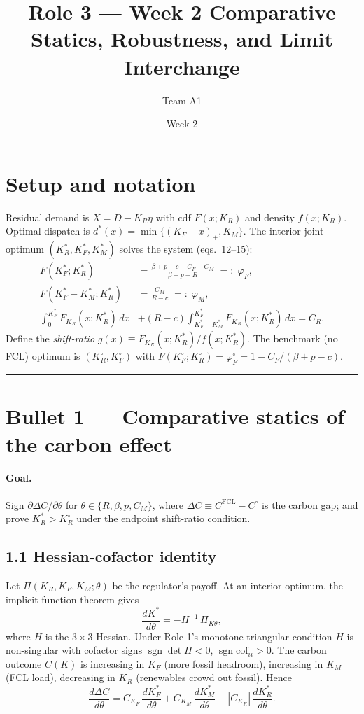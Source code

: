 \documentclass[11pt]{article}
\title{Role 3 --- Week 2 Comparative Statics, Robustness, and Limit Interchange}
\author{Team A1}
\date{Week 2}
\theoremstyle{remark}
\begin{document}
\maketitle

\section*{Setup and notation}
Residual demand is $X=D-K_R\eta$ with cdf $F(x;K_R)$ and density $f(x;K_R)$.
Optimal dispatch is $d^*(x)=\min\{(K_F-x)_+,K_M\}$. The interior joint
optimum $(K_R^*,K_F^*,K_M^*)$ solves the system (eqs.\ 12--15):
\begin{align}
  F(K_F^*;K_R^*) &= \frac{\beta+p-c-C_F-C_M}{\beta+p-R} \;=:\; \varphi_F, \\
  F(K_F^*-K_M^*;K_R^*) &= \frac{C_M}{R-c} \;=:\; \varphi_M, \\
  \int_0^{K_F^*}\!\!F_{K_R}(x;K_R^*)\,dx
   &+ (R-c)\!\!\int_{K_F^*-K_M^*}^{K_F^*}\!\!F_{K_R}(x;K_R^*)\,dx = C_R.
\end{align}
Define the \emph{shift-ratio} $g(x)\equiv F_{K_R}(x;K_R^*)/f(x;K_R^*)$.
The benchmark (no FCL) optimum is $(K_R^\circ,K_F^\circ)$ with
$F(K_F^\circ;K_R^\circ)=\varphi_F^{\circ}=1-C_F/(\beta+p-c)$.

\bigskip
\hrule
\bigskip

\section{Bullet 1 --- Comparative statics of the carbon effect}

\paragraph{Goal.} Sign $\partial\Delta C/\partial\theta$ for
$\theta\in\{R,\beta,p,C_M\}$, where
$\Delta C \equiv C^{\mathrm{FCL}}-C^{\circ}$ is the carbon gap; and
prove $K_R^*>K_R^\circ$ under the endpoint shift-ratio condition.

\subsection*{1.1 Hessian-cofactor identity}
Let $\Pi(K_R,K_F,K_M;\theta)$ be the regulator's payoff. At an interior
optimum, the implicit-function theorem gives
\[
   \frac{d K^*}{d\theta} = -H^{-1}\,\Pi_{K\theta},
\]
where $H$ is the $3\times3$ Hessian. Under Role 1's monotone-triangular
condition $H$ is non-singular with cofactor signs
$\operatorname{sgn}\det H<0$, $\operatorname{sgn}\mathrm{cof}_{ii}>0$.
The carbon outcome $C(K)$ is increasing in $K_F$ (more fossil headroom),
increasing in $K_M$ (FCL load), decreasing in $K_R$ (renewables crowd out
fossil). Hence
\[
   \frac{d\Delta C}{d\theta}=
   C_{K_F}\,\frac{dK_F^*}{d\theta}+C_{K_M}\,\frac{dK_M^*}{d\theta}
   -|C_{K_R}|\,\frac{dK_R^*}{d\theta}.
\]
\end{document}
